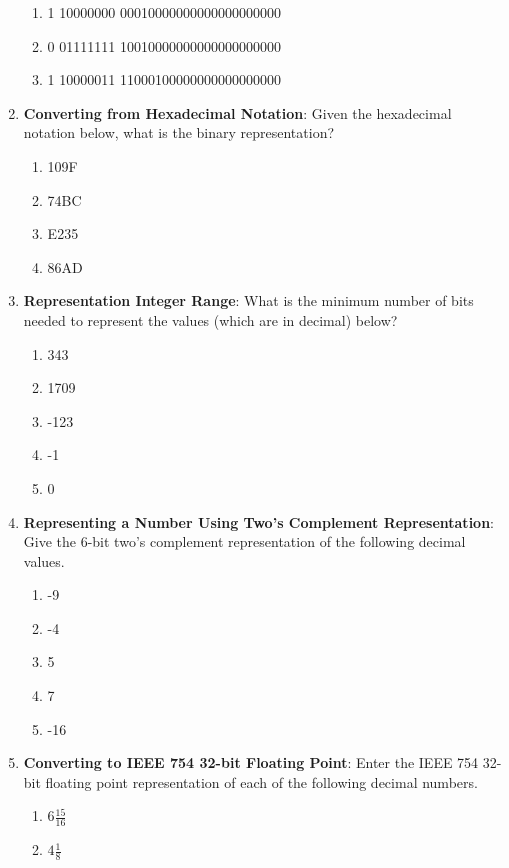 \documentclass{article}
\begin{document}
\begin{enumerate}[label=(\alph*)]
    \begin{enumerate}[label=(\roman*)]
        \item 1 10000000 00010000000000000000000
        \item 0 01111111 10010000000000000000000
        \item 1 10000011 11000100000000000000000
    \end{enumerate}
    \newpage
    \item \textbf{Converting from Hexadecimal Notation}: Given the hexadecimal notation below, what is the binary representation?
    \begin{enumerate}[label=(\roman*)]
        \item 109F
        \item 74BC
        \item E235
        \item 86AD
    \end{enumerate}
    \item \textbf{Representation Integer Range}: What is the minimum number of bits needed to represent the values (which are in decimal) below?
    \begin{enumerate}[label=(\roman*)]
        \item 343
        \item 1709
        \item -123
        \item -1
        \item 0
    \end{enumerate}
    \item \textbf{Representing a Number Using Two's Complement Representation}: Give the 6-bit two's complement representation of the following decimal values.
    \begin{enumerate}[label=(\roman*)]
        \item -9
        \item -4
        \item 5
        \item 7
        \item -16
    \end{enumerate}
    \item \textbf{Converting to IEEE 754 32-bit Floating Point}: Enter the IEEE 754 32-bit floating point representation of each of the following decimal numbers.
    \begin{enumerate}[label=(\roman*)]
        \item $6 \frac{15}{16}$
        \item $4 \frac{1}{8}$

\end{enumerate}
\end{enumerate}
\end{document}

